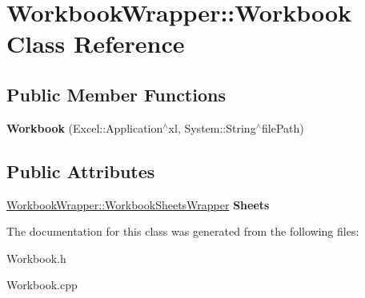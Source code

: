 \hypertarget{class_workbook_wrapper_1_1_workbook}{}\section{Workbook\+Wrapper\+:\+:Workbook Class Reference}
\label{class_workbook_wrapper_1_1_workbook}
\subsection*{Public Member Functions}
\begin{DoxyCompactItemize}
\item 
\hypertarget{class_workbook_wrapper_1_1_workbook_a3c912e843627d6fde920e313d16047e1}{}{\bfseries Workbook} (Excel\+::\+Application$^\wedge$xl, System\+::\+String$^\wedge$file\+Path)\label{class_workbook_wrapper_1_1_workbook_a3c912e843627d6fde920e313d16047e1}

\end{DoxyCompactItemize}
\subsection*{Public Attributes}
\begin{DoxyCompactItemize}
\item 
\hypertarget{class_workbook_wrapper_1_1_workbook_a0f75222149a6f584ecad7c20433723d0}{}\hyperlink{class_workbook_wrapper_1_1_workbook_sheets_wrapper}{Workbook\+Wrapper\+::\+Workbook\+Sheets\+Wrapper} {\bfseries Sheets}\label{class_workbook_wrapper_1_1_workbook_a0f75222149a6f584ecad7c20433723d0}

\end{DoxyCompactItemize}


The documentation for this class was generated from the following files\+:\begin{DoxyCompactItemize}
\item 
Workbook.\+h\item 
Workbook.\+cpp\end{DoxyCompactItemize}

